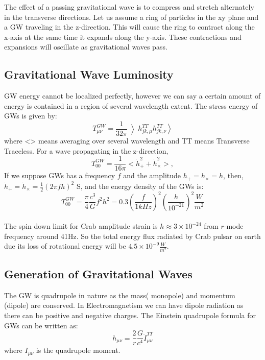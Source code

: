 \documentclass{ttuthes2007}
\begin{document}
	The effect of a passing gravitational wave is to compress and stretch
alternately in the transverse directions. Let us assume a ring of particles in
the xy
plane and a \ac{GW} traveling in the  z-direction. This will cause the
ring to contract along the x-axis at the same time it expands along the y-axis. These
contractions and expansions will oscillate as  gravitational waves pass. 

\subsection{Gravitational Wave Luminosity}
\ac{GW} energy cannot be localized perfectly,
however we can say a certain amount of energy is contained in a region of
several wavelength extent. The stress energy of \acp{GW} is given by:
\begin{equation}
T_{\mu\nu}^{GW} = \frac{1}{32\pi}\left\rangle
h_{jk,\mu}^{TT}h_{jk,\nu}^{TT}\right\rangle
\end{equation}
where <> means averaging over several wavelength and TT means Transverse
Traceless.
For a wave propagating in the z-direction, 
\begin{equation}
T_{00}^{GW}=\frac{1}{16\pi}<\dot{h}_+^2+\dot{h}_\times ^2>,
\end{equation}
If we suppose \acp{GW} has a frequency $f$ and the amplitude $h_+ = h_\times = h$,
then, $\dot{h}_+ = \dot{h}_\times = \frac{1}{2}(2\pi fh)^2$
S, and the energy density of the \acp{GW} is:
\begin{equation}
T_{00}^{GW} = \frac{\pi}{4}\frac{c^3}{G}f^2 h^2=0.3\left(\frac{f}{1kHz}\right )^2
\left(\frac{h}{10^{-21}}\right )^2\frac{W}{m^2}
\end{equation}
\\
The spin down limit for Crab amplitude strain is $h\approx 3 \times 10^{-24}$
from
$r$-mode frequency around 41Hz. So the total energy flux radiated by Crab pulsar
on earth due its loss of rotational energy will be
$4.5\times10^{-9}\frac{W}{m^2}$.

\subsection{Generation of Gravitational Waves}

	The \ac{GW} is quadrupole in nature as the mass( monopole) and
momentum (dipole) are conserved. In Electromagnetism we can have dipole
radiation as there can be positive and negative charges.
The Einstein quadrupole formula for \acp{GW} can be written as:
\begin{equation}
h_{\mu\nu}= \frac{2}{r}\frac{G}{c^4}\ddot{I}_{\mu\nu}^{TT}
\end{equation}
where $I_{\mu\nu}$ is the quadrupole moment.
\end{document}
